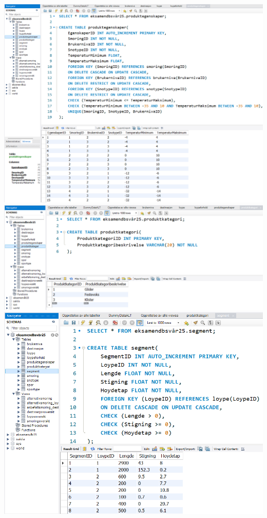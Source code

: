 \documentclass[10pt, a4paper]{article}
\begin{document}
\includegraphics[width=\textwidth]{produktegenskaper.png}
\includegraphics[width=\textwidth]{produktkategori.png}
\includegraphics[width=\textwidth]{segment.png}
\end{document}
